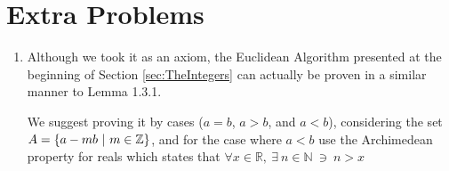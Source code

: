 \section{Extra Problems}

\begin{enumerate}
    \item Although we took it as an axiom, the Euclidean Algorithm presented at the beginning of Section \ref{sec:TheIntegers} can actually be proven in a similar manner to Lemma 1.3.1. 
    
    We suggest proving it by cases ($a=b$, $a>b$, and $a<b$), considering the set $A=\{a-mb \ | \ m \in {\mathbb{ Z}}\}$, and for the case where $a<b$ use the Archimedean property for reals which states that \(\forall x \in \mathbb{R}, \ \exists \ n \in \mathbb{N} \ \ni \ n>x\)
\end{enumerate}
